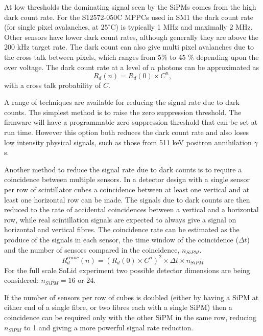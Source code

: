 \documentclass[a4paper]{article}
\begin{document}
At low thresholds the dominating signal seen by the SiPMs comes from the high dark count rate.
For the S12572-050C MPPCs used in SM1 the dark count rate (for single pixel avalanches, at $25^{\circ}$C) is typically 1 MHz and maximally 2 MHz.
Other sensors have lower dark count rates, although generally they are above the 200 kHz target rate.
The dark count can also give multi pixel avalanches due to the cross talk between pixels, which ranges from 5\% to 45 \% depending upon the over voltage.
The dark count rate at a level of $n$ photons can be approximated as
\begin{equation}
    R_d(n) = R_d(0)\times C^n,
\end{equation}
with a cross talk probability of $C$.

A range of techniques are available for reducing the signal rate due to dark counts.
The simplest method is to raise the zero suppression threshold.
The firmware will have a programmable zero suppression threshold that can be set at run time.
However this option both reduces the dark count rate and also loses low intensity physical signals, such as those from 511 keV positron annihilation $\gamma$s.

Another method to reduce the signal rate due to dark counts is to require a coincidence between multiple sensors.
In a detector design with a single sensor per row of scintillator cubes a coincidence between at least one vertical and at least one horizontal row can be made.
The signals due to dark counts are then reduced to the rate of accidental coincidences between a vertical and a horizontal row, while real scintillation signals are expected to always give a signal on horizontal and vertical fibres.
The coincidence rate can be estimated as the produce of the signals in each sensor, the time window of the coincidence ($\Delta t$) and the number of sensors compared in the coincidence, $n_{SiPM}$.
\begin{equation}
    R_d^{coinc}(n) = (R_d(0)\times C^n)^2\times\Delta t\times n_{SiPM}
\end{equation}
For the full scale SoLid experiment two possible detector dimensions are being considered: $n_{SiPM} = 16$ or $24$.

If the number of sensors per row of cubes is doubled (either by having a SiPM at either end of a single fibre, or two fibres each with a single SiPM) then a coincidence can be required only with the other SiPM in the same row, reducing $n_{SiPM}$ to 1 and giving a more powerful signal rate reduction.
\end{document}
